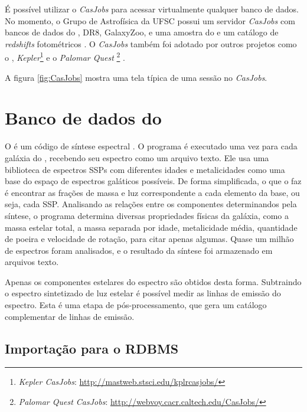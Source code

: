 É possível utilizar o {\em CasJobs} para acessar virtualmente qualquer banco de
dados. No momento, o Grupo de Astrofísica da UFSC possui um servidor {\em
CasJobs} com bancos de dados do \starlight, \SDSS DR8, GalaxyZoo\citneed, e uma
amostra do \galex e um catálogo de {\em redshifts} fotométricos
\citep{OMill2011}. O {\em CasJobs} também foi adotado por outros projetos como o
\galex, {\em Kepler}\footnote{{\em Kepler CasJobs}:
\url{http://mastweb.stsci.edu/kplrcasjobs/}} e o {\em Palomar Quest
}\footnote{{\em Palomar Quest CasJobs}:
\url{http://webvoy.cacr.caltech.edu/CasJobs/}} \citep{Djorgovski2008}.

A figura \ref{fig:CasJobs} mostra uma tela típica de uma sessão no {\em
CasJobs}.



\section{Banco de dados do \STARLIGHT}

O \starlight é um código de síntese espectral \citep{CidFernandes2005}. O
programa é executado uma vez para cada galáxia do \SDSS, recebendo seu espectro
como um arquivo texto. Ele usa uma biblioteca de espectros SSPs com diferentes
idades e metalicidades como uma base do espaço de espectros galáticos possíveis.
De forma simplificada, o que o \starlight faz é encontrar as frações de massa e
luz correspondente a cada elemento da base, ou seja, cada SSP. Analisando as
relações entre os componentes determinandos pela síntese, o programa determina
diversas propriedades físicas da galáxia, como a massa estelar total, a massa
separada por idade, metalicidade média, quantidade de poeira e velocidade de
rotação, para citar apenas algumas. Quase um milhão de espectros foram
analisados, e o resultado da síntese foi armazenado em arquivos texto.

Apenas os componentes estelares do espectro são obtidos desta forma. Subtraindo
o espectro sintetizado de luz estelar é possível medir as linhas de emissão do
espectro. Esta é uma etapa de pós-processamento, que gera um catálogo
complementar de linhas de emissão.

\subsection{Importação para o RDBMS}

